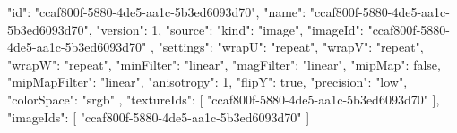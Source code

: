 {
  "id": "ccaf800f-5880-4de5-aa1c-5b3ed6093d70",
  "name": "ccaf800f-5880-4de5-aa1c-5b3ed6093d70",
  "version": 1,
  "source": {
    "kind": "image",
    "imageId": "ccaf800f-5880-4de5-aa1c-5b3ed6093d70"
  },
  "settings": {
    "wrapU": "repeat",
    "wrapV": "repeat",
    "wrapW": "repeat",
    "minFilter": "linear",
    "magFilter": "linear",
    "mipMap": false,
    "mipMapFilter": "linear",
    "anisotropy": 1,
    "flipY": true,
    "precision": "low",
    "colorSpace": "srgb"
  },
  "textureIds": [
    "ccaf800f-5880-4de5-aa1c-5b3ed6093d70"
  ],
  "imageIds": [
    "ccaf800f-5880-4de5-aa1c-5b3ed6093d70"
  ]
}
